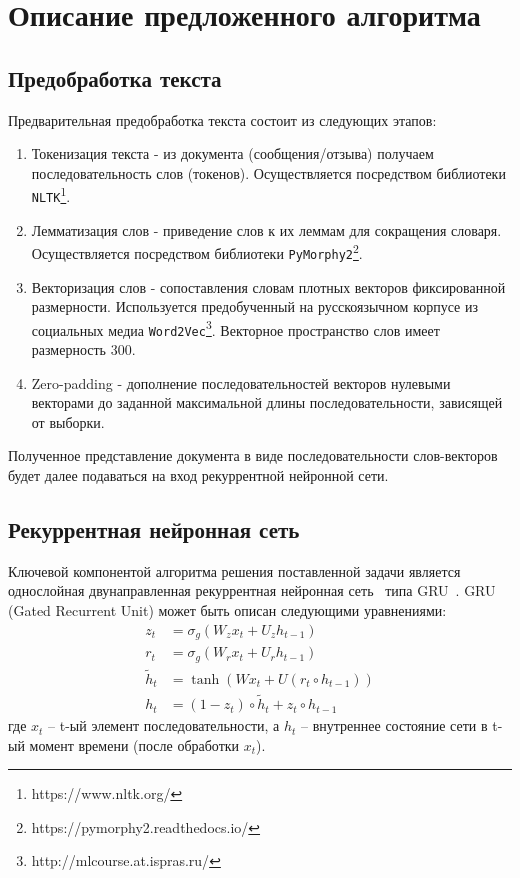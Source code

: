 \chapter{Описание предложенного алгоритма}

\section{Предобработка текста}
Предварительная предобработка текста состоит из следующих этапов:

\begin{enumerate}
	\item Токенизация текста - из документа (сообщения/отзыва) получаем последовательность слов (токенов). Осуществляется посредством библиотеки \texttt{NLTK}\footnote{https://www.nltk.org/}.
	\item Лемматизация слов - приведение слов к их леммам для сокращения словаря. Осуществляется посредством библиотеки \texttt{PyMorphy2}\footnote{https://pymorphy2.readthedocs.io/}.
	\item Векторизация слов - сопоставления словам плотных векторов фиксированной размерности. Используется предобученный на русскоязычном корпусе из социальных медиа \texttt{Word2Vec}\footnote{http://mlcourse.at.ispras.ru/}. Векторное пространство слов имеет размерность 300.
	\item Zero-padding - дополнение последовательностей векторов нулевыми векторами до заданной максимальной длины последовательности, зависящей от выборки.
\end{enumerate}

Полученное представление документа в виде последовательности слов-векторов будет далее подаваться на вход рекуррентной нейронной сети.

\section{Рекуррентная нейронная сеть}
Ключевой компонентой алгоритма решения поставленной задачи является однослойная двунаправленная рекуррентная нейронная сеть~\cite{schuster} типа GRU~\cite{cho}. GRU (Gated Recurrent Unit) может быть описан следующими уравнениями:
	\begin{align}
	z_{t}&=\sigma_{g}(W_{z}x_{t}+U_{z}h_{t-1})\\
	r_{t}&=\sigma_{g}(W_{r}x_{t}+U_{r}h_{t-1})\\
	\tilde{h}_{t}&=\tanh(Wx_{t}+U(r_{t}\circ h_{t-1}))\\
	h_{t}&=(1-z_{t})\circ \tilde{h}_{t}+z_{t}\circ h_{t-1}
	\end{align}	
где $x_{t}$ -- t-ый элемент последовательности, а $h_{t}$ -- внутреннее состояние сети в t-ый момент времени (после обработки $x_{t}$).


